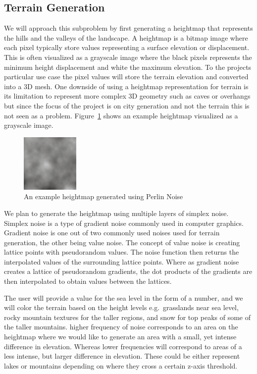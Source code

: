 \subsection{Terrain Generation}
We will approach this subproblem by first generating a heightmap that represents the hills and the valleys of the landscape. 
A heightmap is a bitmap image where each pixel typically store values representing a surface elevation or displacement.
This is often visualized as a grayscale image where the black pixels represents the minimum height displacement and white the maximum elevation.
To the projects particular use case the pixel values will store the terrain elevation and converted into a 3D mesh. %
One downside of using a heightmap representation for terrain is its limitation to represent more complex 3D geometry such as caves or overhangs but since the focus of the project is on city generation and not the terrain this is not seen as a problem.
Figure~\ref{fig:heightmap} shows an example heightmap visualized as a grayscale image. 

\begin{figure}[h]
  \centering
  \includegraphics[width=0.25\textwidth]{figure/heightmap.png}
  \caption{An example heightmap generated using Perlin Noise} 
  \label{fig:heightmap}
\end{figure}

We plan to generate the heightmap using multiple layers of simplex noise.
Simplex noise is a type of gradient noise commonly used in computer graphics. 
Gradient noise is one out of two commonly used noises used for terrain generation, the other being value noise.  
The concept of value noise is creating lattice points with pseudorandom values. 
The noise function then returns the interpolated values of the surrounding lattice points. 
Where as gradient noise creates a lattice of pseudorandom gradients, the dot products of the gradients are then interpolated to obtain values between the lattices. 

The user will provide a value for the sea level in the form of a number, and we will color the terrain based on the height levels e.g.\ grasslands near sea level, rocky mountain textures for the taller regions, and snow for top peaks of some of the taller mountains. 
higher frequency of noise corresponds to an area on the heightmap where we would like to generate an area with a small, yet intense difference in elevation.
Whereas lower frequencies will correspond to areas of a less intense, but larger difference in elevation. 
These could be either represent lakes or mountains depending on where they cross a certain z-axis threshold. 


